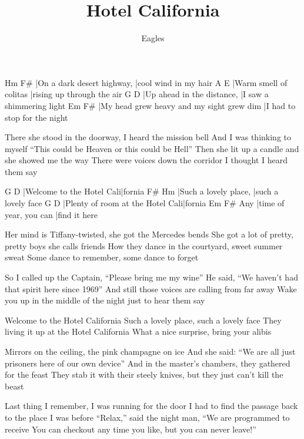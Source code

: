 \documentclass{song}
\title{Hotel California}
\author{Eagles}
\begin{document}
\strophe
Hm                         F#
|On a dark desert highway, |cool wind in my hair
A                      E
|Warm smell of colitas |rising up through the air
G                          D
|Up ahead in the distance, |I saw a shimmering light
Em                                        F#
|My head grew heavy and my sight grew dim |I had to stop for the night
\endstrophe

\strophe*
There she stood in the doorway, I heard the mission bell
And I was thinking to myself ``This could be Heaven or this could be Hell''
Then she lit up a candle and she showed me the way
There were voices down the corridor I thought I heard them say
\endstrophe

G                         D
|Welcome to the Hotel Cali|fornia
F#                    Hm
|Such a lovely place, |such a lovely face
G                                D
|Plenty of room at the Hotel Cali|fornia
    Em                     F#
Any |time of year, you can |find it here
\endstrophe

\strophe*
Her mind is Tiffany-twisted, she got the Mercedes bends
She got a lot of pretty, pretty boys she calls friends
How they dance in the courtyard, sweet summer sweat
Some dance to remember, some dance to forget
\endstrophe

\strophe*
So I called up the Captain, ``Please bring me my wine''
He said, ``We haven't had that spirit here since 1969''
And still those voices are calling from far away
Wake you up in the middle of the night just to hear them say
\endstrophe

Welcome to the Hotel California
Such a lovely place, such a lovely face
They living it up at the Hotel California
What a nice surprise, bring your alibis
\endstrophe

\strophe*
Mirrors on the ceiling, the pink champagne on ice
And she said: ``We are all just prisoners here of our own device''
And in the master's chambers, they gathered for the feast
They stab it with their steely knives, but they just can't kill the beast
\endstrophe

\strophe*
Last thing I remember, I was running for the door
I had to find the passage back to the place I was before
``Relax,'' said the night man, ``We are programmed to receive
You can checkout any time you like, but you can never leave!''
\endstrophe
\end{document}
